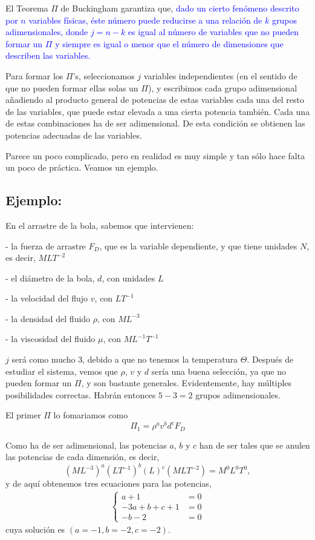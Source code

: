 	El Teorema $\Pi$ de Buckingham garantiza que, \textcolor{blue}{dado
		un cierto fenómeno descrito por $n$ variables f\'{i}sicas, éste
		número puede reducirse a una relación de $k$ grupos adimensionales,
		donde $j=n-k$ es igual al número de variables que no pueden formar
		un $\Pi$ y siempre es igual o menor que el número de dimensiones
		que describen las variables.}
	
	Para formar los $\Pi$'s, seleccionamos $j$ variables independientes
	(en el sentido de que no pueden formar ellas solas un $\Pi$), y escribimos
	cada grupo adimensional añadiendo al producto general de potencias
	de estas variables cada una del resto de las variables, que puede
	estar elevada a una cierta potencia también. Cada una de estas combinaciones
	ha de ser adimensional. De esta condición se obtienen las potencias
	adecuadas de las variables.
	
	Parece un poco complicado, pero en realidad es muy simple y tan sólo
	hace falta un poco de práctica. Veamos un ejemplo.

	
	\subsection*{Ejemplo:}
		En el arrastre de la bola, sabemos que intervienen:
		
		- la fuerza de arrastre $F_{D}$, que es la variable dependiente,
		y que tiene unidades $N$, es decir, $MLT^{-2}$ 
		
		- el diámetro de la bola, $d$, con unidades $L$ 
		
		- la velocidad del flujo $v$, con $LT^{-1}$ 
		
		- la densidad del fluido $\rho$, con $ML^{-3}$ 
		
		- la viscosidad del fluido $\mu$, con $ML^{-1}T^{-1}$ 
		
		$j$ será como mucho 3, debido a que no tenemos la temperatura $\Theta$.
		Después de estudiar el sistema, vemos que $\rho$, $v$ y $d$ ser\'{i}a
		una buena selección, ya que no pueden formar un $\Pi$, y son bastante
		generales. Evidentemente, hay múltiples posibilidades correctas. Habrán
		entonces $5-3=2$ grupos adimensionales.
		
		El primer $\Pi$ lo fomariamos como 
		\[
		\Pi_{1}=\rho^{a}v^{b}d^{c}F_{D}
		\]
		
		Como ha de ser adimensional, las potencias $a$, $b$ y $c$ han
		de ser tales que se anulen las potencias de cada dimensión, es decir,
		\[
		(ML^{-3})^{a}(LT^{-1})^{b}(L)^{c}(MLT^{-2})=M^{0}L^{0}T^{0},
		\]
		y de aquí obtenemos tres ecuaciones para las potencias, 
		\begin{eqnarray*}
			\begin{cases}
				a+1 & =0\\
				-3a+b+c+1 & =0\\
				-b-2 & =0
			\end{cases}
		\end{eqnarray*}
		cuya solución es $(a=-1,b=-2,c=-2).$
		
